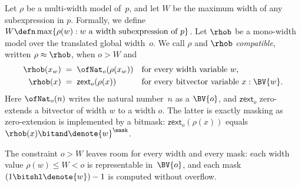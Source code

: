 \begin{definition}[Compatibility]\label{mwbv:def:compat}
Let $\rho$ be a multi-width model of~$p$, and let $W$ be the
  maximum width of any subexpression in $p$. Formally, we define $W \defn \max\{\rho(w) : w
\text{ a width subexpression of } p\}$.
  Let $\rhob$ be a mono-width model over the translated global width~$o$. We call
$\rho$ and $\rhob$ \emph{compatible}, written $\rho \approx \rhob$, when $o > W$
and
\begin{align*}
  \rhob(x_w) \;&=\; \ofNat_o(\rho(x_w)) && \text{for every width variable } w, \\
  \rhob(x)   \;&=\; \mathsf{zext}_o(\rho(x))     && \text{for every bitvector variable } x : \BV{w}.
\end{align*}
Here $\ofNat_o(n)$ writes the natural number~$n$ as a $\BV{o}$, and
$\mathsf{zext}_o$ zero-extends a bitvector of width $w$ to a width $o$.
The latter is exactly masking as zero-extension is implemented by a bitmask:
$\mathsf{zext}_o(\rho(x))$ equals $\rhob(x) \bitand \denote{w}^\mask$.
\end{definition}

The constraint $o > W$ leaves room for every width and every mask: each width
value $\rho(w) \le W < o$ is representable in~$\BV{o}$, and each mask $(1 \bitshl
\denote{w}) - 1$ is computed without overflow.

